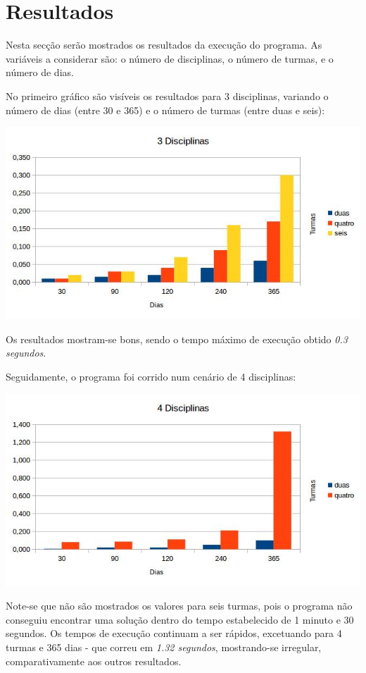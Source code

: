 \documentclass{llncs}
\begin{document}
\section{Resultados}
Nesta secção serão mostrados os resultados da execução do programa. As variáveis a considerar são: o número de disciplinas, o número de turmas, e o número de dias.\par
No primeiro gráfico são visíveis os resultados para 3 disciplinas, variando o número de dias (entre 30 e 365) e o número de turmas (entre duas e seis):

\includegraphics[scale=0.85]{images/chart1.jpg}

Os resultados mostram-se bons, sendo o tempo máximo de execução obtido \textit{0.3 segundos}.\par
\newpage
Seguidamente, o programa foi corrido num cenário de 4 disciplinas:

\includegraphics[scale=0.85]{images/chart2.jpg}

Note-se que não são mostrados os valores para seis turmas, pois o programa não conseguiu encontrar uma solução dentro do tempo estabelecido de 1 minuto e 30 segundos.\newline 
Os tempos de execução continuam a ser rápidos, excetuando para 4 turmas e 365 dias - que correu em \textit{1.32 segundos}, mostrando-se irregular, comparativamente aos outros resultados.
\end{document}
